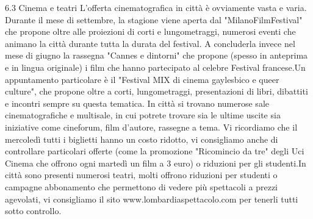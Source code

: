 6.3 Cinema e teatri
L'offerta cinematografica in città è ovviamente vasta e varia. Durante il mese di settembre, la stagione viene aperta dal "MilanoFilmFestival" che propone oltre alle proiezioni di corti e lungometraggi, numerosi eventi che animano la città durante tutta la durata del festival. A concluderla invece nel mese di giugno la rassegna "Cannes e dintorni" che propone (spesso in anteprima e in lingua originale) i film che hanno partecipato al celebre Festival francese.Un appuntamento particolare è il "Festival MIX di cinema gaylesbico e queer culture", che propone oltre a corti, lungometraggi, presentazioni di libri, dibattiti e incontri sempre su questa tematica.
In città si trovano numerose sale cinematografiche e multisale, in cui potrete trovare sia le ultime uscite sia iniziative come cineforum, film d'autore, rassegne a tema. Vi ricordiamo che il mercoledì tutti i biglietti hanno un costo ridotto, vi consigliamo anche di controllare particolari offerte (come la promozione "Ricomincio da tre" degli Uci Cinema che offrono ogni martedì un film a 3 euro) o riduzioni per gli studenti.In città sono presenti numerosi teatri, molti offrono riduzioni per studenti o campagne abbonamento che permettono di vedere più spettacoli a prezzi agevolati, vi consigliamo il sito www.lombardiaspettacolo.com per tenerli tutti sotto controllo.

